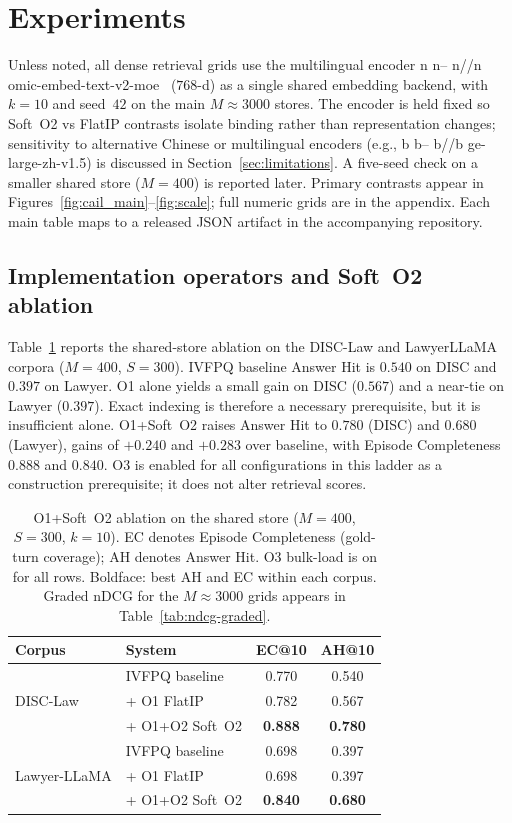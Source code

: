 \documentclass[preprint,12pt,authoryear]{elsarticle}
\DeclareRobustCommand{\modelid}[1]{{\ttfamily\modelidbreak#1\relax}}
\def\modelidbreak#1{%
  \ifx#1\relax\else
    \ifx#1--\hspace{0pt}\else
    \ifx#1//\hspace{0pt}\else#1\fi\fi
    \expandafter\modelidbreak
  \fi}
\newcommand{\compacttab}{\setlength{\tabcolsep}{4.5pt}\renewcommand{\arraystretch}{1.05}}
\begin{document}
\section{Experiments}\label{sec:experiments}

Unless noted, all dense retrieval grids use the multilingual encoder
\modelid{nomic-embed-text-v2-moe}~\cite{nussbaum2025nomic} ($768$-d)
as a single shared embedding backend, with $k{=}10$ and seed~$42$ on the main $M{\approx}3000$ stores.
The encoder is held fixed so Soft~O2 vs FlatIP contrasts isolate binding rather than representation changes; sensitivity to alternative Chinese or multilingual encoders (e.g., \modelid{bge-large-zh-v1.5}) is discussed in Section~\ref{sec:limitations}.
A five-seed check on a smaller shared store ($M{=}400$) is reported later.
Primary contrasts appear in Figures~\ref{fig:cail_main}--\ref{fig:scale}; full numeric grids are in the appendix.
Each main table maps to a released JSON artifact in the accompanying repository.

\subsection{Implementation operators and Soft~O2 ablation}\label{sec:exp-o1o3}
Table~\ref{tab:o1o2} reports the shared-store ablation on the DISC-Law and
Lawyer\-LLaMA corpora ($M{=}400$, $S{=}300$).
IVFPQ baseline Answer Hit is $0.540$ on DISC and $0.397$ on Lawyer.
O1 alone yields a small gain on DISC ($0.567$) and a near-tie on Lawyer ($0.397$).
Exact indexing is therefore a necessary prerequisite, but it is insufficient alone.
O1+Soft~O2 raises Answer Hit to $0.780$ (DISC) and $0.680$ (Lawyer), gains of $+0.240$ and $+0.283$ over baseline, with Episode Completeness $0.888$ and $0.840$.
O3 is enabled for all configurations in this ladder as a construction prerequisite; it does not alter retrieval scores.

\begin{table}[htbp]
\centering
\caption{O1+Soft~O2 ablation on the shared store ($M{=}400$, $S{=}300$, $k{=}10$). EC denotes Episode Completeness (gold-turn coverage); AH denotes Answer Hit. O3 bulk-load is on for all rows. Boldface: best AH and EC within each corpus. Graded nDCG for the $M{\approx}3000$ grids appears in Table~\ref{tab:ndcg-graded}.}
\label{tab:o1o2}
\compacttab\footnotesize
\begin{tabular}{@{}llcc@{}}
\toprule
\textbf{Corpus} & \textbf{System} & \textbf{EC@10} & \textbf{AH@10} \\
\midrule
\multirow{3}{*}{DISC-Law}
 & IVFPQ baseline & 0.770 & 0.540 \\
 & + O1 FlatIP & 0.782 & 0.567 \\
 & + O1+O2 Soft~O2 & \textbf{0.888} & \textbf{0.780} \\
\midrule
\multirow{3}{*}{Lawyer-LLaMA}
 & IVFPQ baseline & 0.698 & 0.397 \\
 & + O1 FlatIP & 0.698 & 0.397 \\
 & + O1+O2 Soft~O2 & \textbf{0.840} & \textbf{0.680} \\
\bottomrule
\end{tabular}
\end{table}
\end{document}
